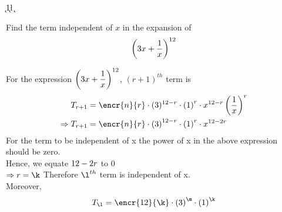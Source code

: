 


\DIVIDE{}\k 
\ADD\k{1}\l
\SUBTRACT\vbthree\k\m

\question[4] Find the term independent of $x$ in the expansion of 
 \[\left({3 x + \dfrac{1}{x}}\right)^{12}\]

\watchout

\begin{solution}[\halfpage]
For the expression $\left(3 x + \dfrac{1}{x}\right)^{12}$, $(r+1)^{th}$ term is 
	\begin{align}
	T_{r+1} &= \encr{n}{r} \cdot (\vbone)^{\vbthree - r}\cdot \left( \vbtwo \right)^{r} \cdot {x}^{\vbthree - r}  \left(\dfrac{1}{x}\right)^{r}\\
	\Rightarrow T_{r+1} &= \encr{n}{r} \cdot \left( \vbone \right)^{\vbthree - r}\cdot \left( \vbtwo \right)^{r} \cdot {x}^{\vbthree - 2r} \\
	\end{align}
For the term to be independent of x the power of x in the above expression should be zero.\\
Hence, we equate $12 - 2r$ to $0$\\
$\Rightarrow r = \k \\$
Therefore ${\l}^{th}$ term is independent of x.\\
Moreover, 
	\begin{align}
	{T}_{\l} = \encr{\vbthree}{\k} \cdot \left( \vbone \right)^{\m}\cdot \left( \vbtwo \right)^{\k}
	 \end{align}
\end{solution}

